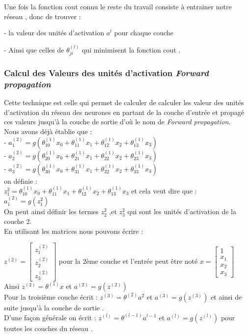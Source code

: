 Une fois la fonction cout connu le reste du travail consiste à entrainer notre réseau , donc de  trouver :

- la valeur des unités d'activation ${a}^{l}$ pour chaque couche 

- Ainsi que celles de ${\theta}_{ji}^{(l)}$ qui minimisent la fonction cout .

\subsubsection{Calcul des Valeurs des unités d'activation \emph{Forward propagation}}

Cette technique est celle qui permet de calculer  de calculer les valeur des unités d'activation du réseau des neurones en partant de la couche d'entrée et propagé ces valeurs jusqu'à   la couche de sortie d'où le nom de \emph{Forward propagation}.\\
Nous avons déjà établie que : \\
- ${a}_{1}^{(2) }= g({\theta}_{10}^{(1)}{x}_{0} + {\theta}_{11}^{(1)}{x}_{1} + {\theta}_{12}^{(1)}{x}_{2} + {\theta}_{13}^{(1)}{x}_{3})$ \\
- ${a}_{2}^{(2) }= g({\theta}_{20}^{(1)}{x}_{0} + {\theta}_{21}^{(1)}{x}_{1} + {\theta}_{22}^{(1)}{x}_{2} + {\theta}_{23}^{(1)}{x}_{3})$ \\
- ${a}_{3}^{(2) }= g({\theta}_{30}^{(1)}{x}_{0} + {\theta}_{31}^{(1)}{x}_{1} + {\theta}_{32}^{(1)}{x}_{2} + {\theta}_{33}^{(1)}{x}_{3})$ \\
on définie : \\
 $ {z}_{1}^{2} = {\theta}_{10}^{(1)}{x}_{0} + {\theta}_{11}^{(1)}{x}_{1} + {\theta}_{12}^{(1)}{x}_{2} + {\theta}_{13}^{(1)}{x}_{3}$ et cela veut dire que :\\
 ${a}_{1}^{(2) } = g({z}_{1}^{2} )$ \\
 On peut ainsi définir les termes  ${z}_{2}^{2}$ ,et ${z}_{3}^{2}$ qui sont les unités d'activation de la couche 2.\\
 En utilisant les matrices  nous pouvons écrire :
 
 ${z}^{(2)} = 
\begin{bmatrix}
 {z}_{1}^{(2)}\\ 
 {z}_{2}^{(2)} \\ 
 {z}_{3}^{(2)}
\end{bmatrix} $  pour la 2ème couche et l'entrée peut être noté $x = 
\begin{bmatrix}
 1\\ 
 {x}_{1} \\ 
 {x}_{2} \\
 {x}_{3} 
\end{bmatrix} $ \\
Ainsi ${z}^{(2)} = {\theta}^{(1)}x$ et ${a}^{(2)}=g({z}^{(2)})$ \\
Pour la troisième couche écrit :   ${z}^{(3)} = {\theta}^{(2)}{a}^{2}$ et ${a}^{(3)}=g({z}^{(3)})$   et ainsi de suite jusqu'à la couche de sortie .\\
D'une façon générale on écrit : ${z}^{(l)} = {\theta}^{(l-1)}{a}^{l-1}$ et ${a}^{(l)}=g({z}^{(l)})$ pour toutes les couches du réseau .

